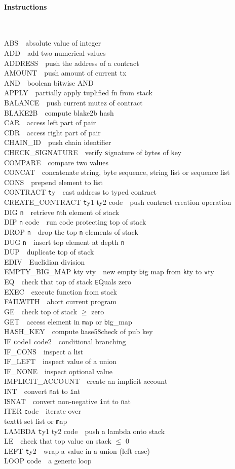 \documentclass[10pt]{article}
\newcommand{\command}[2]{#1~\dotfill{}~#2\\} %
\newcommand{\sectiontitle}[1]{\paragraph{#1} \ \\} %
\begin{document}
\begin{multicols}{3}
  \sectiontitle{Instructions}
  \begin{flushright}
    \noindent
    \command{ABS}{absolute value of integer}
    \command{ADD}{add two numerical values}
    \command{ADDRESS}{push the address of a contract}
    \command{AMOUNT}{push amount of current tx}
    \command{AND}{boolean bitwise AND}
    \command{APPLY}{partially apply tuplified fn from stack}
    \command{BALANCE}{push current mutez of contract}
    \command{BLAKE2B}{compute blake2b hash}
    \command{CAR}{access left part of pair}
    \command{CDR}{access right part of pair}
    \command{CHAIN\_ID}{push chain identifier}
    \command{CHECK\_SIGNATURE}{verify {\texttt signature} of {\texttt bytes} of {\texttt key}}
    \command{COMPARE}{compare two values}
    \command{CONCAT}{concatenate string, byte sequence, string list or sequence list}
    \command{CONS}{prepend element to list}
    \command{CONTRACT {\texttt ty}}{cast address to typed contract}
    \command{CREATE\_CONTRACT {\texttt ty1 ty2 code}}{push contract creation operation}
    \command{DIG {\texttt n}}{retrieve {\texttt n}th element of stack}
    \command{DIP {\texttt n code}}{run code protecting top of stack}
    \command{DROP {\texttt n}}{drop the top {\texttt n} elements of stack}
    \command{DUG {\texttt n}}{insert top element at depth {\texttt n}}
    \command{DUP}{duplicate top of stack}
    \command{EDIV}{Euclidian division}
    \command{EMPTY\_BIG\_MAP {\texttt kty vty}}{new empty {\texttt big map} from {\texttt kty} to {\texttt vty}}
    \command{EQ}{check that top of stack {\texttt EQ}uals zero}
    \command{EXEC}{execute function from stack}
    \command{FAILWITH}{abort current program}
    \command{GE}{check top of stack $\geq$ zero}
    \command{GET}{access element in {\texttt map} or {\texttt big\_map}}
    \command{HASH\_KEY}{compute {\texttt base58check} of pub key}
    \command{IF {\texttt code1 code2}}{conditional branching}
    \command{IF\_CONS}{inspect a list}
    \command{IF\_LEFT}{inspect value of a union}
    \command{IF\_NONE}{inspect optional value}
    \command{IMPLICIT\_ACCOUNT}{create an implicit account}
    \command{INT}{convert {\texttt nat} to {\texttt int}}
    \command{ISNAT}{convert non-negative {\texttt int} to {\texttt nat}}
    \command{ITER {\texttt code}}{iterate over {\\texttt set list} or {\texttt map}}
    \command{LAMBDA {\texttt ty1 ty2 code}}{push a lambda onto stack}
    \command{LE}{check that top value on stack $\leq$ 0}
    \command{LEFT {\texttt ty2}}{wrap a value in a union (left case)}
    \command{LOOP {\texttt code}}{a generic loop}

\end{flushright}
\end{multicols}
\end{document}
